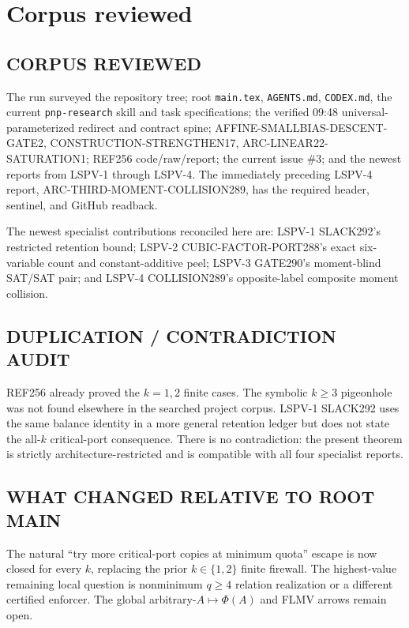 \documentclass[11pt]{article}
\begin{document}
\section{Corpus reviewed}

\subsection*{CORPUS REVIEWED}
The run surveyed the repository tree; root \texttt{main.tex}, \texttt{AGENTS.md}, \texttt{CODEX.md}, the current \texttt{pnp-research} skill and task specifications; the verified 09:48 universal-parameterized redirect and contract spine; AFFINE-SMALLBIAS-DESCENT-GATE2, CONSTRUCTION-STRENGTHEN17, ARC-LINEAR22-SATURATION1; REF256 code/raw/report; the current issue \#3; and the newest reports from LSPV-1 through LSPV-4.  The immediately preceding LSPV-4 report, ARC-THIRD-MOMENT-COLLISION289, has the required header, sentinel, and GitHub readback.

The newest specialist contributions reconciled here are: LSPV-1 SLACK292's restricted retention bound; LSPV-2 CUBIC-FACTOR-PORT288's exact six-variable count and constant-additive peel; LSPV-3 GATE290's moment-blind SAT/SAT pair; and LSPV-4 COLLISION289's opposite-label composite moment collision.

\subsection*{DUPLICATION / CONTRADICTION AUDIT}
REF256 already proved the $k=1,2$ finite cases.  The symbolic $k\geq3$ pigeonhole was not found elsewhere in the searched project corpus.  LSPV-1 SLACK292 uses the same balance identity in a more general retention ledger but does not state the all-$k$ critical-port consequence.  There is no contradiction: the present theorem is strictly architecture-restricted and is compatible with all four specialist reports.

\subsection*{WHAT CHANGED RELATIVE TO ROOT MAIN}
The natural ``try more critical-port copies at minimum quota'' escape is now closed for every $k$, replacing the prior $k\in\{1,2\}$ finite firewall.  The highest-value remaining local question is nonminimum $q\geq4$ relation realization or a different certified enforcer.  The global arbitrary-$A\mapsto\Phi(A)$ and FLMV arrows remain open.
\end{document}
